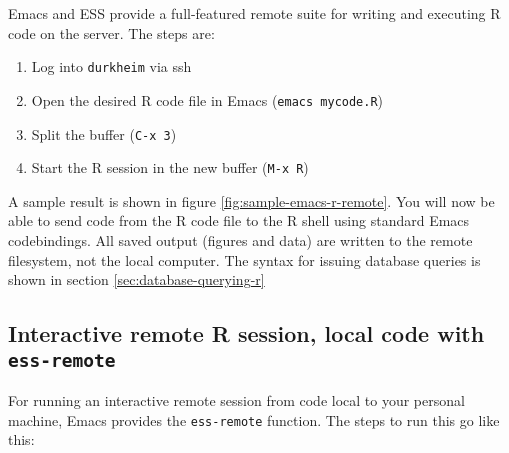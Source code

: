 \documentclass[11pt]{article}
\begin{document}
Emacs and ESS provide a full-featured remote suite for writing and
executing R code on the server. The steps are:
\begin{enumerate}
\item Log into \texttt{durkheim} via ssh
\item Open the desired R code file in Emacs (\texttt{emacs mycode.R})
\item Split the buffer (\texttt{C-x 3})
\item Start the R session in the new buffer (\texttt{M-x R})
\end{enumerate}
A sample result is shown in figure
\ref{fig:sample-emacs-r-remote}. You will now be able to send code
from the R code file to the R shell using standard Emacs codebindings. All
saved output (figures and data) are written to the remote filesystem,
not the local computer. The syntax for issuing database queries is
shown in section \ref{sec:database-querying-r}

\subsection{Interactive remote R session, local code with \texttt{ess-remote}}
\label{sec:remote-r-session}

For running an interactive remote session from code local to your
personal machine, Emacs provides the \texttt{ess-remote} function. The
steps to run this go like this:
\end{document}
